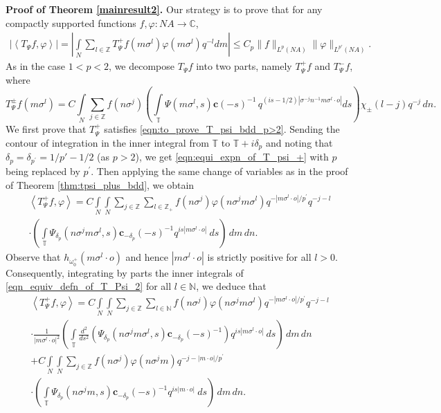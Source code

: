 \documentclass[12pt,reqno]{amsart}
\newcommand{\C}{\mathbb C}
\newcommand{\N}{\mathbb N}
\newcommand{\T}{\mathbb{T}}
\theoremstyle{definition}
\theoremstyle{definition}
\numberwithin{equation}{section}
\begin{document}
\noindent\textbf{Proof of Theorem \ref{mainresult2}.} Our strategy is to prove that for any compactly supported functions $ f, \varphi :  NA \rightarrow \C $,
\begin{align}\label{eqn:to_prove_T_psi_bdd_p>2}
	\left| \left\langle T_{\Psi} f, \varphi\right\rangle\right|=  \left| \int\limits_{N}\sum\limits_{l\in\mathbb{Z} }   T_{\Psi}^{+}f(m\sigma^{l}) \varphi(m\sigma^l) q^{-l} dm\right|\leq C_p\|f\|_{L^p(NA)}  \|\varphi\|_{L^{p'}(NA)}.
\end{align}
As in  the case $ 1<p<2 $, we decompose  $T_\Psi f$ into two parts, namely $T_\Psi ^+ f$ and $ T_\Psi^- f $, where 
	$$ T_{\Psi}^{\pm}f(m\sigma^{l})= C  \int\limits_{N}\sum\limits_{j\in\mathbb{Z}}f(n\sigma^{j}) 
	\left(\int\limits_{\mathbb{T}}\Psi(m\sigma^l,s) \mathbf{c}(-s)^{-1}\,q^{(is-1/2)|\sigma^{-j}n^{-1}m\sigma^{l}\cdot o|}ds\right)\chi_{\pm}(l-j)q^{-j} \,dn.$$
We first  prove that $  T_{\Psi}^{+}$ satisfies  \eqref{eqn:to_prove_T_psi_bdd_p>2}. Sending the contour of integration in the inner integral from $ \T $ to $ \T+i\delta_{p} $ and noting that $\delta_{p}=\delta_{p^\prime} =1/p'-1/2$ (as $ p>2$), we get \eqref{eqn:equi_expn_of_T_psi_+} with $p$ being replaced by $ p^\prime $.
 Then  applying the same change of variables as in the proof of Theorem \ref{thm:tpsi_plus_bdd}, we obtain
\begin{multline}\label{eqn_equiv_defn_of_T_Psi_2}
	\left\langle T_{\Psi}^{+}f, \varphi\right\rangle = C \int\limits_{N}  \int\limits_{N} \sum\limits_{j\in\mathbb{Z} } \sum\limits_{l\in\mathbb{Z}_+ }   f(n\sigma^{j})  \varphi(n\sigma^j m \sigma^{l})q^{-|m \sigma^{l}\cdot o|/p^{\prime}}q^{-j-l}\\
	\cdot \left(\int\limits_{\mathbb{T}}\Psi_{\delta_{p}}(n\sigma^j m \sigma^{l},s)\mathbf{c}_{-\delta_{p}}(-s)^{-1} q^{is| m\sigma^{l}\cdot o|}~ds\right) \,dm\,dn.
\end{multline}
Observe that $h_{\omega^{+}_{0}}(m\sigma^{l}\cdot o)$ and hence $|m\sigma^l\cdot o|$ is strictly positive for all $l>0$. Consequently, integrating by parts the inner integrals of \eqref{eqn_equiv_defn_of_T_Psi_2} for all $l\in\mathbb{N}$, we deduce that
\begin{multline*}
	 \left\langle T_{\Psi}^{+}f, \varphi\right\rangle = C \int\limits_{N}  \int\limits_{N} \sum\limits_{j\in\mathbb{Z} } \sum\limits_{l \in \N }   f(n\sigma^{j})  \varphi(n\sigma^jm \sigma^{l})q^{-|m \sigma^{l}\cdot o|/p^{\prime}}q^{-j-l}\\
\cdot\frac{1}{|m\sigma^l\cdot o|^2} \left( \int\limits_{\mathbb{T}} \frac{d^2}{ds^2}\left(\Psi_{\delta_{p}}(n\sigma^j m \sigma^{l},s)\mathbf{c}_{-\delta_{p}}(-s)^{-1}\right) q^{is| m \sigma^{l}\cdot o|}~ds\right) \,dm\,dn\\
+ C \int\limits_{N}  \int\limits_{N} \sum\limits_{j\in\mathbb{Z} }   f(n\sigma^{j})  \varphi(n\sigma^jm ) q^{-j-|m \cdot o|/p^{\prime}}\\
\cdot  \left( \int\limits_{\mathbb{T}}  \Psi_{\delta_{p}}(n\sigma^j m,s)\mathbf{c}_{-\delta_{p}}(-s)^{-1} q^{is| m\cdot o|}~ds\right) \,dm\,dn.
\end{multline*}
\end{document}
